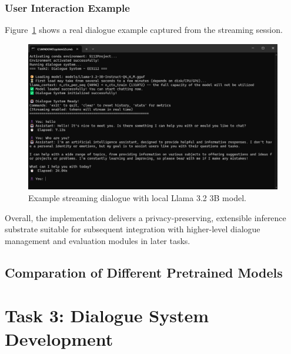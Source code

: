 \documentclass[12pt,a4paper]{article}
\begin{document}
\subsubsection*{User Interaction Example}

Figure~\ref{fig:llama_chat_screenshot} shows a real dialogue example captured from the streaming session.

\begin{figure}[H]
    \centering
    \includegraphics[width=1\linewidth]{Figures/llama对话.png}
    \caption{Example streaming dialogue with local Llama 3.2 3B model.}
    \label{fig:llama_chat_screenshot}
\end{figure}

Overall, the implementation delivers a privacy-preserving, extensible inference substrate suitable for subsequent integration with higher-level dialogue management and evaluation modules in later tasks.

\subsection{Comparation of Different Pretrained Models}


\section{Task 3: Dialogue System Development}
\end{document}

